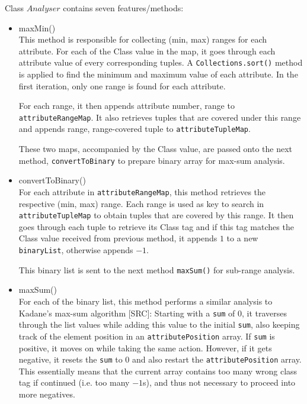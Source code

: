 \begin{description}
Class $Analyser$ contains seven features/methods:

\begin{itemize}
	\item{maxMin()} \\
	This method is responsible for collecting (min, max) ranges for each attribute. For each of the Class value in the map, it goes through each attribute value of every corresponding tuples. A \texttt{Collections.sort()} method is applied to find the minimum and maximum value of each attribute. In the first iteration, only one range is found for each attribute.
	
	For each range, it then appends {attribute number, range} to \texttt{attributeRangeMap}. It also retrieves tuples that are covered under this range and appends {range, range-covered tuple} to \texttt{attributeTupleMap}. 
	
	These two maps, accompanied by the Class value, are passed onto the next method, \texttt{convertToBinary} to prepare binary array for max-sum analysis.
	
	\item{convertToBinary()} \\
	For each attribute in \texttt{attributeRangeMap}, this method retrieves the respective (min, max) range. Each range is used as key to search in \texttt{attributeTupleMap} to obtain tuples that are covered by this range. It then goes through each tuple to retrieve its Class tag and if this tag matches the Class value received from previous method, it appends $1$ to a new \texttt{binaryList}, otherwise appends $-1$. 
	
	This binary list is sent to the next method \texttt{maxSum()} for sub-range analysis.
	
	\item{maxSum()} \\
	For each of the binary list, this method performs a similar analysis to Kadane's max-sum algorithm [SRC]: Starting with a \texttt{sum} of $0$, it traverses through the list values while adding this value to the initial \texttt{sum}, also keeping track of the element position in an \texttt{attributePosition} array. If \texttt{sum} is positive, it moves on while taking the same action. However, if it gets negative, it resets the \texttt{sum} to $0$ and also restart the \texttt{attributePosition} array. This essentially means that the current array contains too many wrong class tag if continued (i.e. too many $-1$s), and thus not necessary to proceed into more negatives. 
	

\end{itemize}
\end{description}
